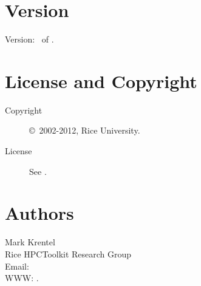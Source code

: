 \documentclass[english]{article}
\begin{document}
\section{Version}

Version: \Version\ of \Date.

\section{License and Copyright}

\begin{description}
\item[Copyright] \copyright\ 2002-2012, Rice University.
\item[License] See .
\end{description}

\section{Authors}

\noindent
Mark Krentel \\
Rice HPCToolkit Research Group \\
Email:  \\
WWW: .

\LatexManEnd
\end{document}
